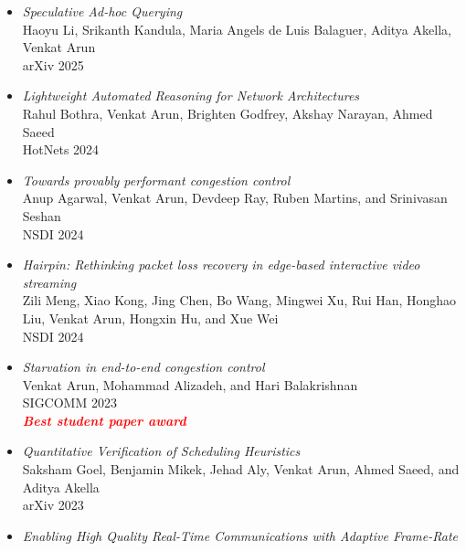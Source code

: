 \documentclass[notitlepage]{article}
\newcommand{\heading}[1]{\vspace{1em}{\large \MakeUppercase{\textrm{#1}}}

  \hrulefill
}
\newcommand{\highlight}[1]{\textcolor{red}{\textit{\textbf{#1}}}}
\begin{document}
\heading{Publications}

\begin{itemize}[noitemsep,nolistsep]
        \item {\it Speculative Ad-hoc Querying}\label{paper:speql}\\
      Haoyu Li, Srikanth Kandula, Maria Angels de Luis Balaguer, Aditya Akella, Venkat Arun\\
      arXiv 2025\\
              \item {\it Lightweight Automated Reasoning for Network Architectures}\label{paper:archie}\\
      Rahul Bothra, Venkat Arun, Brighten Godfrey, Akshay Narayan, Ahmed Saeed\\
      HotNets 2024\\
              \item {\it Towards provably performant congestion control}\label{paper:ccmatic}\\
      Anup Agarwal, Venkat Arun, Devdeep Ray, Ruben Martins, and Srinivasan Seshan\\
      NSDI 2024\\
              \item {\it Hairpin: Rethinking packet loss recovery in edge-based interactive video streaming}\label{paper:hairpin}\\
      Zili Meng, Xiao Kong, Jing Chen, Bo Wang, Mingwei Xu, Rui Han, Honghao Liu, Venkat Arun, Hongxin Hu, and Xue Wei\\
      NSDI 2024\\
              \item {\it Starvation in end-to-end congestion control}\label{paper:starvation}\\
      Venkat Arun, Mohammad Alizadeh, and Hari Balakrishnan\\
      SIGCOMM 2023\\
              \highlight{Best student paper award}\\
              \item {\it Quantitative Verification of Scheduling Heuristics}\label{paper:perf_verif}\\
      Saksham Goel, Benjamin Mikek, Jehad Aly, Venkat Arun, Ahmed Saeed, and Aditya Akella\\
      arXiv 2023\\
              \item {\it Enabling High Quality Real-Time Communications with Adaptive Frame-Rate}\label{paper:afr}\\

\end{itemize}
\end{document}
